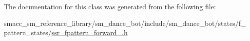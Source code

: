 The documentation for this class was generated from the following file\+:\begin{DoxyCompactItemize}
\item 
smacc\+\_\+sm\+\_\+reference\+\_\+library/sm\+\_\+dance\+\_\+bot/include/sm\+\_\+dance\+\_\+bot/states/f\+\_\+pattern\+\_\+states/\hyperlink{ssr__fpattern__forward__2_8h}{ssr\+\_\+fpattern\+\_\+forward\+\_.\+h}\end{DoxyCompactItemize}
